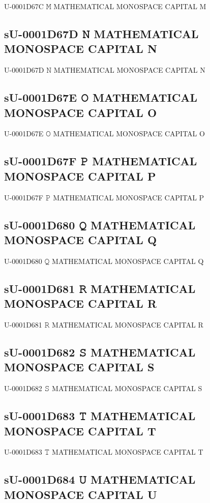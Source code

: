 U-0001D67C 𝙼 MATHEMATICAL MONOSPACE CAPITAL M

\subsection{sU-0001D67D 𝙽 MATHEMATICAL MONOSPACE CAPITAL N}

U-0001D67D 𝙽 MATHEMATICAL MONOSPACE CAPITAL N

\subsection{sU-0001D67E 𝙾 MATHEMATICAL MONOSPACE CAPITAL O}

U-0001D67E 𝙾 MATHEMATICAL MONOSPACE CAPITAL O

\subsection{sU-0001D67F 𝙿 MATHEMATICAL MONOSPACE CAPITAL P}

U-0001D67F 𝙿 MATHEMATICAL MONOSPACE CAPITAL P

\subsection{sU-0001D680 𝚀 MATHEMATICAL MONOSPACE CAPITAL Q}

U-0001D680 𝚀 MATHEMATICAL MONOSPACE CAPITAL Q

\subsection{sU-0001D681 𝚁 MATHEMATICAL MONOSPACE CAPITAL R}

U-0001D681 𝚁 MATHEMATICAL MONOSPACE CAPITAL R

\subsection{sU-0001D682 𝚂 MATHEMATICAL MONOSPACE CAPITAL S}

U-0001D682 𝚂 MATHEMATICAL MONOSPACE CAPITAL S

\subsection{sU-0001D683 𝚃 MATHEMATICAL MONOSPACE CAPITAL T}

U-0001D683 𝚃 MATHEMATICAL MONOSPACE CAPITAL T

\subsection{sU-0001D684 𝚄 MATHEMATICAL MONOSPACE CAPITAL U}

